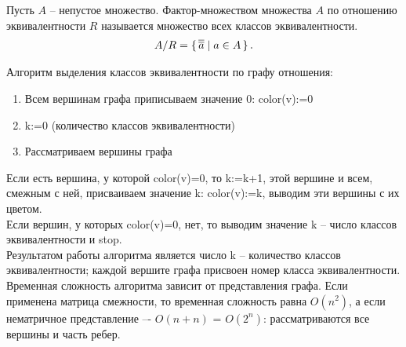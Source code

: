 \begin{definition}
    Пусть $A$ -- непустое множество. Фактор-множеством
    множества $A$ по отношению эквивалентности $R$ называется множество всех
    классов эквивалентности.
    \begin{align*}
        A/R=\set{\overline{\overline{a}} | a \in A}.
    \end{align*}
\end{definition}

Алгоритм выделения классов эквивалентности по графу отношения:
\begin{enumerate}[left=0.0em, labelsep=1em, topsep=0.5em, itemsep=0pt, parsep=0.5em]
    \item Всем вершинам графа приписываем значение 0: color(v):=0
    \item k:=0 (количество классов эквивалентности)
    \item Рассматриваем вершины графа
\end{enumerate}

Если есть вершина, у которой color(v)=0, то k:=k+1, этой вершине и всем,
смежным с ней, присваиваем значение k: color(v):=k, выводим эти вершины с
их цветом. \\
Если вершин, у которых color(v)=0, нет, то выводим значение k – число
классов эквивалентности и stop. \\
Результатом работы алгоритма является число k – количество классов
эквивалентности; каждой вершите графа присвоен номер класса
эквивалентности. \\

Временная сложность алгоритма зависит от представления графа. Если
применена матрица смежности, то временная сложность равна $O(n^2)$, а если
нематричное представление –- $O(n+n)$ = $O(2^n)$: рассматриваются все вершины и часть ребер.